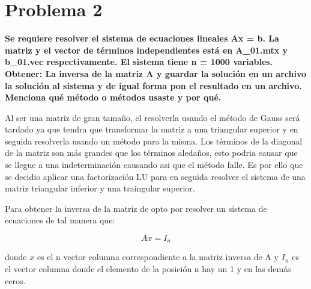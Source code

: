 \section*{Problema 2}
\textbf{Se requiere resolver el sistema de ecuaciones lineales Ax = b. La matriz y el vector de términos independientes está en A\_01.mtx y b\_01.vec respectivamente. El sistema tiene n = 1000 variables. Obtener: La inversa de la matriz A y guardar la solución en un archivo la solución al sistema y de igual forma pon el resultado en un archivo. Menciona qué método o métodos usaste y por qué.}

Al ser una matriz de gran tamaño, el resolverla usando el método de Gauss será tardado ya que tendra que transformar la matriz a una triangular superior y en seguida resolverla usando un método para la misma. Los términos de la diagonal de la matriz son más grandes que los términos aledaños, esto podria causar que se llegue a una indeterminación causando asi que el método falle. Es por ello que se decidio aplicar una factorización LU para en seguida resolver el sistema de una matriz triangular inferior y una traingular superior.

Para obtener la inversa de la matriz de opto por resolver un sistema de ecuaciones de tal manera que:

\begin{equation*}
    Ax=I_n
\end{equation*}

donde $x$ es el n vector columna correspondiente a la matriz inversa de A y $I_n$ es el vector columna donde el elemento de la posición n hay un 1 y en las demás ceros.